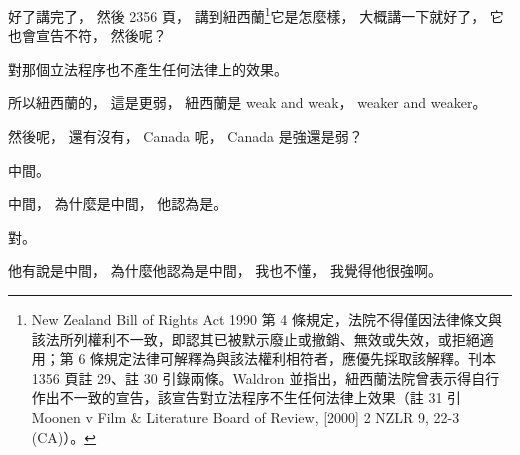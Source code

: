 \hypertarget{w06:cue:910}{}好了講完了，
\hypertarget{w06:cue:911}{}然後 2356 頁，
\hypertarget{w06:cue:912}{}講到紐西蘭\footnote{New Zealand Bill of Rights Act 1990 第 4 條規定，法院不得僅因法律條文與該法所列權利不一致，即認其已被默示廢止或撤銷、無效或失效，或拒絕適用；第 6 條規定法律可解釋為與該法權利相符者，應優先採取該解釋。刊本 1356 頁註 29、註 30 引錄兩條。Waldron 並指出，紐西蘭法院曾表示得自行作出不一致的宣告，該宣告對立法程序不生任何法律上效果（註 31 引 Moonen v Film \& Literature Board of Review, [2000] 2 NZLR 9, 22-3 (CA)）。}它是怎麼樣，
\hypertarget{w06:cue:913}{}大概講一下就好了，
\hypertarget{w06:cue:914}{}它也會宣告不符，
\hypertarget{w06:cue:915}{}然後呢？

\hypertarget{w06:cue:916}{}對那個立法程序也不產生任何法律上的效果。

\hypertarget{w06:cue:917}{}所以紐西蘭的，
\hypertarget{w06:cue:918}{}這是更弱，
\hypertarget{w06:cue:919}{}紐西蘭是 weak and weak，
\hypertarget{w06:cue:920}{}weaker and weaker。

\hypertarget{w06:cue:921}{}然後呢，
\hypertarget{w06:cue:922}{}還有沒有，
\hypertarget{w06:cue:923}{}Canada 呢，
\hypertarget{w06:cue:924}{}Canada 是強還是弱？

\hypertarget{w06:cue:925}{}中間。

\hypertarget{w06:cue:926}{}中間，
\hypertarget{w06:cue:927}{}為什麼是中間，
\hypertarget{w06:cue:928}{}他認為是。

\hypertarget{w06:cue:929}{}對。

\hypertarget{w06:cue:930}{}他有說是中間，
\hypertarget{w06:cue:931}{}為什麼他認為是中間，
\hypertarget{w06:cue:932}{}我也不懂，
\hypertarget{w06:cue:933}{}我覺得他很強啊。

